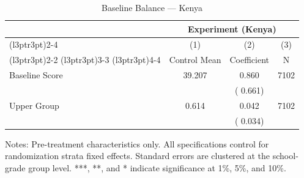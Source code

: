\begin{table}[!h]
\centering
\caption{Baseline Balance --- Kenya}
\label{tab:ke_balance}
\begin{threeparttable}
\begin{tabular}[t]{lccc}
\toprule
\multicolumn{1}{c}{ } & \multicolumn{3}{c}{Experiment (Kenya)} \\
\cmidrule(l{3pt}r{3pt}){2-4}
\multicolumn{1}{c}{ } & \multicolumn{1}{c}{(1)} & \multicolumn{1}{c}{(2)} & \multicolumn{1}{c}{(3)} \\
\cmidrule(l{3pt}r{3pt}){2-2} \cmidrule(l{3pt}r{3pt}){3-3} \cmidrule(l{3pt}r{3pt}){4-4}
 & Control Mean & Coefficient & N \\
\midrule
Baseline Score &  39.207 &   0.860 & 7102 \\
 & & (  0.661) & \\
Upper Group &   0.614 &   0.042 & 7102 \\
 & & (  0.034) & \\
\bottomrule
\end{tabular}
\begin{tablenotes}[para]
\item Notes: Pre-treatment characteristics only. All specifications control for randomization strata fixed effects. Standard errors are clustered at the school-grade group level. ***, **, and * indicate significance at 1\%, 5\%, and 10\%.
\end{tablenotes}
\end{threeparttable}
\end{table}
